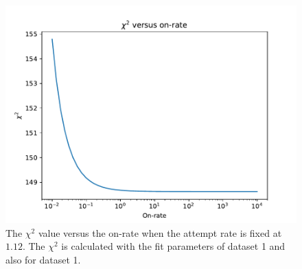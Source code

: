 \begin{figure}
\begin{center}
\includegraphics[width=\textwidth]{images/Dataset1OnRateAttemptRate=1-12}
\caption{The $\chi^2$ value versus the on-rate when the attempt rate is fixed at $1.12$. The $\chi^2$ is calculated with the fit parameters of dataset 1 and also for dataset 1.}
\label{fig:Chi2MinModelOnRate}
\end{center}
\end{figure}

